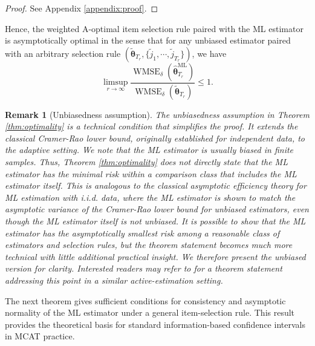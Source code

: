 \documentclass[12pt]{article}
\newcommand{\bftheta}{\boldsymbol{\theta}}
\newtheorem{remark}[theorem]{Remark}
\begin{document}
\begin{proof}
See Appendix \ref{appendix:proof}.
\end{proof}
Hence, the weighted A-optimal item selection rule paired with the ML estimator is asymptotically optimal in the sense that for any unbiased estimator paired with an arbitrary selection rule $(\tilde{\bftheta}_{T_r}, \{\tilde{j}_1,\cdots, \tilde{j}_{T_r}\})$, we have
\begin{equation*}
\limsup_{r\to\infty}\frac{\operatorname{WMSE}_{\delta}(\hat{\bftheta}_{T_r}^{\mathrm{ML}})}{\operatorname{WMSE}_{\delta}(\tilde{\bftheta}_{T_r})}\leq 1.
\end{equation*}  



\begin{remark}[Unbiasedness assumption]
\label{rem:unbiased}
The unbiasedness assumption in Theorem \ref{thm:optimality} is a technical condition that simplifies the proof. It extends the classical Cramer-Rao lower bound, originally established for independent data, to the adaptive setting. We note that the ML estimator is usually biased in finite samples. Thus, Theorem \ref{thm:optimality} does not directly state that the ML estimator has the minimal risk within a comparison class that includes the ML estimator itself. This is analogous to the classical asymptotic efficiency theory for ML estimation with i.i.d. data, where the ML estimator is shown to match the asymptotic variance of the Cramer-Rao lower bound for unbiased estimators, even though the ML estimator itself is not unbiased. It is possible to show that the ML estimator has the asymptotically smallest risk among a reasonable class of estimators and selection rules, but the theorem statement becomes much more technical with little additional practical insight. We therefore present the unbiased version for clarity. Interested readers may refer to  for a theorem statement addressing this point in a similar active-estimation setting.
\end{remark}

The next theorem gives sufficient conditions for consistency and asymptotic normality of the ML estimator under a general item-selection rule. This result provides the theoretical basis for standard information-based confidence intervals in MCAT practice.
\end{document}

